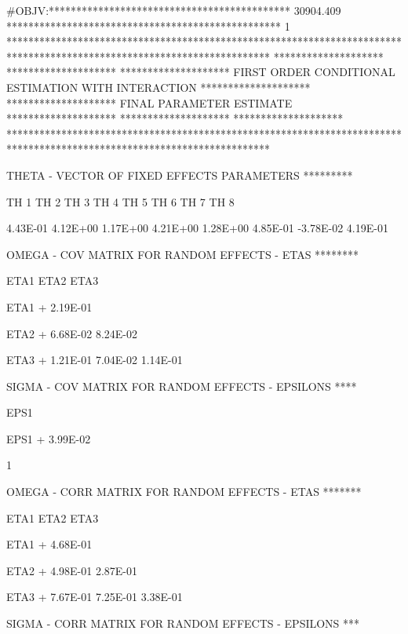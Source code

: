 \documentclass[
  letterpaper,
  toc=chapterentrywithdots,
  listof=totoc,
  11pt,
  headings=small,
  usegeometry]{scrreprt}
\begin{document}
\begin{nonmemlisting}
 #OBJV:********************************************    30904.409       **************************************************
1
 ************************************************************************************************************************
 ********************                                                                                ********************
 ********************               FIRST ORDER CONDITIONAL ESTIMATION WITH INTERACTION              ********************
 ********************                             FINAL PARAMETER ESTIMATE                           ********************
 ********************                                                                                ********************
 ************************************************************************************************************************
 


 THETA - VECTOR OF FIXED EFFECTS PARAMETERS   *********

         TH 1      TH 2      TH 3      TH 4      TH 5      TH 6      TH 7      TH 8     
 
         4.43E-01  4.12E+00  1.17E+00  4.21E+00  1.28E+00  4.85E-01 -3.78E-02  4.19E-01
 


 OMEGA - COV MATRIX FOR RANDOM EFFECTS - ETAS  ********

         ETA1      ETA2      ETA3     
 
 ETA1
+        2.19E-01
 
 ETA2
+        6.68E-02  8.24E-02
 
 ETA3
+        1.21E-01  7.04E-02  1.14E-01
 


 SIGMA - COV MATRIX FOR RANDOM EFFECTS - EPSILONS  ****

         EPS1     
 
 EPS1
+        3.99E-02
 
1


 OMEGA - CORR MATRIX FOR RANDOM EFFECTS - ETAS  *******

         ETA1      ETA2      ETA3     
 
 ETA1
+        4.68E-01
 
 ETA2
+        4.98E-01  2.87E-01
 
 ETA3
+        7.67E-01  7.25E-01  3.38E-01
 


 SIGMA - CORR MATRIX FOR RANDOM EFFECTS - EPSILONS  ***


\end{nonmemlisting}
\end{document}
